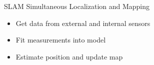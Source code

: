 \documentclass[17pt,mathserif]{beamer}
\begin{document}
    \begin{frame}{SLAM} {Simultaneous Localization and Mapping}
      \vspace*{-3em}
      \begin{center}
        \begin{itemize}
          \item Get data from external and internal sensors
          \item Fit measurements into model
          \item Estimate position and update map
        \end{itemize}
        \vspace*{-0.8em}
        \begin{figure}

        \end{figure}
      \end{center}
      
    \end{frame}
    

        
    
\end{document}
